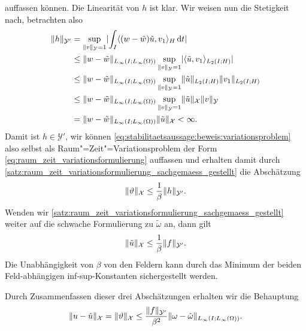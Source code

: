 \documentclass[../main.tex]{subfiles}
\begin{document}
\begin{Lemma}
\begin{Beweis}
\begin{equation}
        \end{equation}
        auffassen können.
        Die Linearität von $h$ ist klar.
        Wir weisen nun die Stetigkeit nach, betrachten also
        \begin{align}
            \lVert h\rVert_{\mathcal Y'}
            &= \sup_{\lVert v\rVert_{\mathcal Y} = 1} \lvert\int_{I} \langle(w - \tilde{w})\tilde{u},v_{1}\rangle_{H} \mathop{}\!\mathrm{d} t\rvert
            \\&\leq \lVert w - \tilde{w}\rVert_{L_{\infty}(I; L_{\infty}(\Omega))} \sup_{\lVert v\rVert_{\mathcal Y} = 1} \lvert\langle\tilde{u},v_{1}\rangle_{L_{2}(I; H)}\rvert
            \\&\leq \lVert w - \tilde{w}\rVert_{L_{\infty}(I; L_{\infty}(\Omega))} \sup_{\lVert v\rVert_{\mathcal Y} = 1} \lVert\tilde{u}\rVert_{L_{2}(I; H)} \lVert v_{1}\rVert_{L_{2}(I; H)}
            \\&\leq \lVert w - \tilde{w}\rVert_{L_{\infty}(I; L_{\infty}(\Omega))} \sup_{\lVert v\rVert_{\mathcal Y} = 1} \lVert\tilde{u}\rVert_{\mathcal X} \lVert v\rVert_{\mathcal Y}
            \\&= \lVert w - \tilde{w}\rVert_{L_{\infty}(I; L_{\infty}(\Omega))} \lVert\tilde{u}\rVert_{\mathcal X}
            < \infty.
        \end{align}
        Damit ist $h \in \mathcal Y'$, wir können \cref{eq:stabilitaetsaussage:beweis:variationsproblem} also selbst als Raum"=Zeit"=Variationsproblem der Form \cref{eq:raum_zeit_variationsformulierung} auffassen und erhalten damit durch \cref{satz:raum_zeit_variationsformulierung_sachgemaess_gestellt} die Abschätzung
        \begin{equation}
            \lVert\vartheta\rVert_{\mathcal X} \leq \frac{1}{\beta} \lVert h\rVert_{\mathcal Y'}.
        \end{equation}
        Wenden wir \cref{satz:raum_zeit_variationsformulierung_sachgemaess_gestellt} weiter auf die schwache Formulierung zu $\tilde{\omega}$ an, dann gilt
        \begin{equation}
            \lVert\tilde{u}\rVert_{\mathcal X} \leq \frac{1}{\beta} \lVert f\rVert_{\mathcal Y'}.
        \end{equation}
        Die Unabhängigkeit von $\beta$ von den Feldern kann durch das Minimum der beiden Feld-abhängigen inf-sup-Konstanten sichergestellt werden.

        Durch Zusammenfassen dieser drei Abschätzungen erhalten wir die Behauptung
        \begin{equation}
            \lVert u - \tilde{u}\rVert_{\mathcal X} = \lVert\vartheta\rVert_{\mathcal X} \leq \frac{\lVert f\rVert_{\mathcal Y'}}{\beta^{2}} \lVert\omega - \tilde{\omega}\rVert_{L_{\infty}(I; L_{\infty}(\Omega))}.
        \end{equation}
    \end{Beweis}
\end{Lemma}
\end{document}
